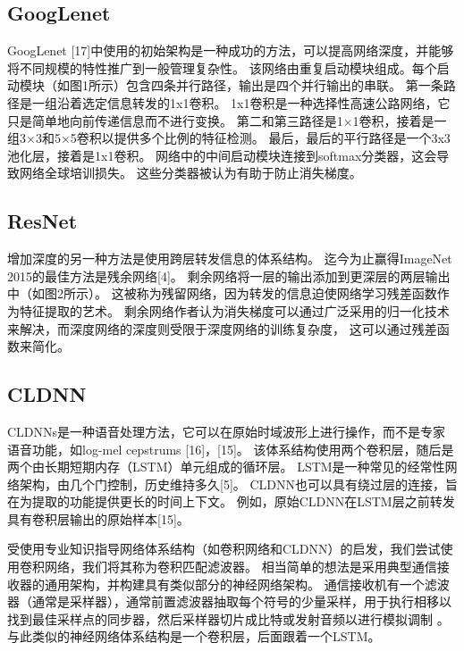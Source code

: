 \subsection{GoogLenet}
GoogLenet [17]中使用的初始架构是一种成功的方法，可以提高网络深度，并能够将不同规模的特性推广到一般管理复杂性。
该网络由重复启动模块组成。每个启动模块（如图1所示）包含四条并行路径，输出是四个并行输出的串联。
第一条路径是一组沿着选定信息转发的1x1卷积。
1x1卷积是一种选择性高速公路网络，它只是简单地向前传递信息而不进行变换。
第二和第三路径是1×1卷积，接着是一组3×3和5×5卷积以提供多个比例的特征检测。
最后，最后的平行路径是一个3x3池化层，接着是1x1卷积。
网络中的中间启动模块连接到softmax分类器，这会导致网络全球培训损失。
这些分类器被认为有助于防止消失梯度。\par

\subsection{ResNet}
增加深度的另一种方法是使用跨层转发信息的体系结构。
迄今为止赢得ImageNet 2015的最佳方法是残余网络[4]。
剩余网络将一层的输出添加到更深层的两层输出中（如图2所示）。
这被称为残留网络，因为转发的信息迫使网络学习残差函数作为特征提取的艺术。 
剩余网络作者认为消失梯度可以通过广泛采用的归一化技术来解决，而深度网络的深度则受限于深度网络的训练复杂度，
这可以通过残差函数来简化。\par


\subsection{CLDNN}
CLDNNs是一种语音处理方法，它可以在原始时域波形上进行操作，而不是专家语音功能，如log-mel cepstrums [16]，[15]。 该体系结构使用两个卷积层，随后是两个由长期短期内存（LSTM）单元组成的循环层。 LSTM是一种常见的经常性网络架构，由几个门控制，历史维持多久[5]。 CLDNN也可以具有绕过层的连接，旨在为提取的功能提供更长的时间上下文。 例如，原始CLDNN在LSTM层之前转发具有卷积层输出的原始样本[15]。\par

受使用专业知识指导网络体系结构（如卷积网络和CLDNN）的启发，我们尝试使用卷积网络，我们将其称为卷积匹配滤波器。 相当简单的想法是采用典型通信接收器的通用架构，并构建具有类似部分的神经网络架构。 通信接收机有一个滤波器（通常是采样器），通常前置滤波器抽取每个符号的少量采样，用于执行相移以找到最佳采样点的同步器，然后采样器切片成比特或发射音频以进行模拟调制 。与此类似的神经网络体系结构是一个卷积层，后面跟着一个LSTM。\par


